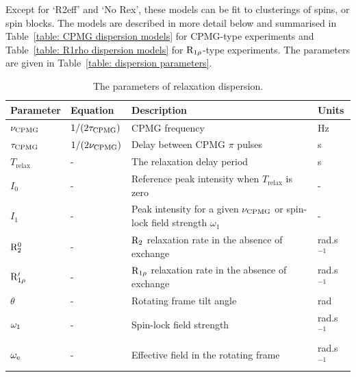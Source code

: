 Except for `R2eff' and `No Rex', these models can be fit to clusterings of spins, or spin blocks.
The models are described in more detail below and summarised in Table~\ref{table: CPMG dispersion models} for CPMG-type experiments and Table~\ref{table: R1rho dispersion models} for $\mathrm{R}_{1\rho}$-type experiments.
The parameters are given in Table~\ref{table: dispersion parameters}.

\begin{table}
\begin{center}
\caption{The parameters of relaxation dispersion.}
\begin{tabular}{llll}
\toprule
Parameter               & Equation              & Description                                                                   & Units \\
\midrule
$\nu_\textrm{CPMG}$               & $1 / (2 \tau_\textrm{CPMG})$    & CPMG frequency                                                                & Hz \\
$\tau_\textrm{CPMG}$              & $1 / (2 \nu_\textrm{CPMG})$     & Delay between CPMG $\pi$ pulses                                               & s \\
$T_\textrm{relax}$      & -                     & The relaxation delay period                                                   & s \\
$I_0$                   & -                     & Reference peak intensity when $T_\textrm{relax}$ is zero                      & - \\
$I_1$                   & -                     & Peak intensity for a given $\nu_\textrm{CPMG}$ or spin-lock field strength $\omega_1$   & - \\
$\mathrm{R}_2^0$             & -                     & $\mathrm{R}_2$ relaxation rate in the absence of exchange                            & rad.s$^{-1}$ \\
$\mathrm{R}_{1\rho}'$         & -                     & $\mathrm{R}_{1\rho}$ relaxation rate in the absence of exchange                         & rad.s$^{-1}$ \\
$\theta$                & -                     & Rotating frame tilt angle                                                     & rad \\
$\omega_1$             & -                     & Spin-lock field strength                                                      & rad.s$^{-1}$ \\
$\omega_\textrm{e}$               & -                     & Effective field in the rotating frame                                         & rad.s$^{-1}$ \\

\end{tabular}
\end{center}
\end{table}

